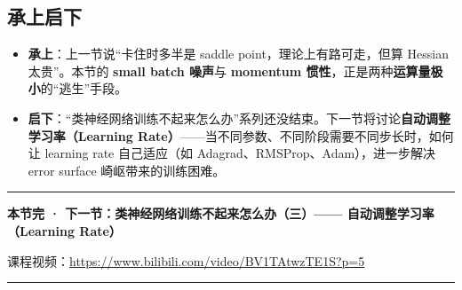 \documentclass[a4paper]{article}
\newcommand{\videourl}{https://www.bilibili.com/video/BV1TAtwzTE1S?p=5}
\begin{document}
\subsection{承上启下}

\begin{itemize}
    \item \textbf{承上}：上一节说``卡住时多半是 saddle point，理论上有路可走，但算 Hessian 太贵''。本节的 \textbf{small batch 噪声}与 \textbf{momentum 惯性}，正是两种\textbf{运算量极小}的``逃生''手段。
    \item \textbf{启下}：``类神经网络训练不起来怎么办''系列还没结束。下一节将讨论\textbf{自动调整学习率（Learning Rate）}——当不同参数、不同阶段需要不同步长时，如何让 learning rate 自己适应（如 Adagrad、RMSProp、Adam），进一步解决 error surface 崎岖带来的训练困难。
\end{itemize}

\vspace{1cm}

\begin{center}
    \rule{0.5\textwidth}{0.5pt}
    \vspace{0.3cm}

    \textbf{本节完 · 下一节：类神经网络训练不起来怎么办（三）—— 自动调整学习率（Learning Rate）}

    课程视频：\href{\videourl}{\videourl}

    \vspace{0.3cm}
    \rule{0.5\textwidth}{0.5pt}
\end{center}
\end{document}
